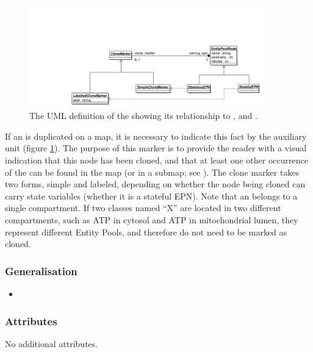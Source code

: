 \begin{figure}[htb]
  \centering
  \includegraphics[width = 0.9\textwidth]{images/clonemarkeruml}
  \caption{The UML definition of the  showing
    its relationship to , 
    and .}
  \label{fig:techref:clonemarkeruml}
\end{figure}

If an  is duplicated on a map, it is
necessary to indicate this fact by the 
auxiliary unit (figure \ref{fig:techref:clonemarkeruml}).  The purpose of this
marker is to provide the reader with a visual indication that this
node has been cloned, and that at least one other occurrence of the
 can be found in the map (or in a submap;
see ).  The clone marker takes two forms, simple and
labeled, depending on whether the node being cloned can carry state
variables (\ie whether it is a stateful EPN). Note that an
 belongs to a single compartment. If two
classes named ``X'' are located in two different compartments, such as
ATP in cytosol and ATP in mitochondrial lumen, they represent
different Entity Pools, and therefore do not need to be marked as
cloned.

\subsubsection{Generalisation}

\begin{itemize}
\item {}
\end{itemize}

\subsubsection{Attributes}

No additional attributes.

